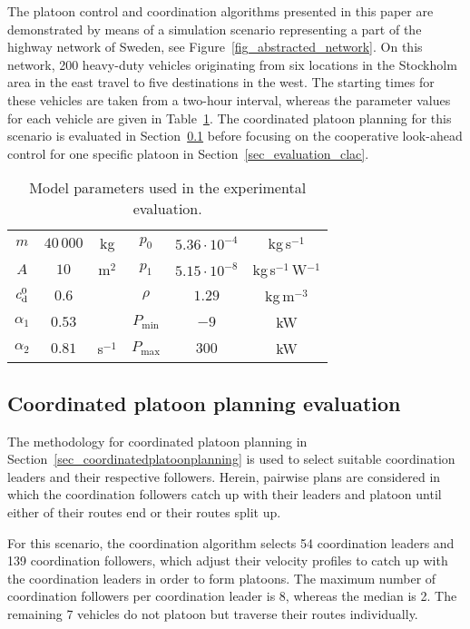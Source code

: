 \documentclass[journal]{IEEEtran}
\begin{document}
The platoon control and coordination algorithms presented in this paper are demonstrated by means of a simulation scenario representing a part of the highway network of Sweden, see Figure~\ref{fig_abstracted_network}. On this network, 200 heavy-duty vehicles originating from six locations in the Stockholm area in the east travel to five destinations in the west. The starting times for these vehicles are taken from a two-hour interval, whereas the parameter values for each vehicle are given in Table~\ref{tab_modelparameters}. The coordinated platoon planning for this scenario is evaluated in Section~\ref{sec_evaluation_platoonplanning} before focusing on the cooperative look-ahead control for one specific platoon in Section~\ref{sec_evaluation_clac}.

\begin{table}
\begin{center}
  \caption{\rm Model parameters used in the experimental evaluation.}
  \label{tab_modelparameters}
  \begin{tabular}{|ccc||ccc|}
  \hline
  $m$ & $40\,000$ & kg               &  $p_0$ & $5.36\cdot10^{-4}$ & kg\,s$^{-1}$ \\
  $A$ & $10$ & m$^2$               &  $p_1$ & $5.15\cdot10^{-8}$ & kg\,s$^{-1}$\,W$^{-1}$ \\
  $c_{\text{\rm d}}^0$ & $0.6$ & &  $\rho$ & $1.29$ & kg\,m$^{-3}$ \\
  $\alpha_1$ & $0.53$ &           &  $P_\text{min}$ & $-9$ & kW \\
  $\alpha_2$ & $0.81$ & s$^{-1}$   &  $P_\text{max}$ & $300$ & kW \\
  \hline
  \end{tabular}
\end{center}
\end{table}


\subsection{Coordinated platoon planning evaluation}\label{sec_evaluation_platoonplanning}
The methodology for coordinated platoon planning in Section~\ref{sec_coordinatedplatoonplanning} is used to select suitable coordination leaders and their respective followers. Herein, pairwise plans are considered in which the coordination followers catch up with their leaders and platoon until either of their routes end or their routes split up.

For this scenario, the coordination algorithm selects 54 coordination leaders and 139 coordination followers, which adjust their velocity profiles to catch up with the coordination leaders in order to form platoons. The maximum number of coordination followers per coordination leader is 8, whereas the median is 2. The remaining 7 vehicles do not platoon but traverse their routes individually.
\end{document}
